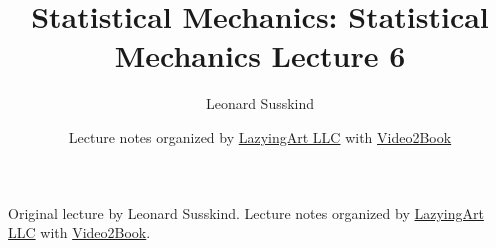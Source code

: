 \documentclass[11pt,oneside]{book}
\begin{document}
\frontmatter
\title{Statistical Mechanics: Statistical Mechanics Lecture 6}
\author{Leonard Susskind}
\date{Lecture notes organized by \href{https://lazying.art}{LazyingArt LLC} with \href{https://github.com/lachlanchen/Video2Book}{Video2Book}}
\maketitle
\begin{center}
\small Original lecture by Leonard Susskind. Lecture notes organized by \href{https://lazying.art}{LazyingArt LLC} with \href{https://github.com/lachlanchen/Video2Book}{Video2Book}.
\end{center}
\clearpage
\mainmatter

\end{document}
